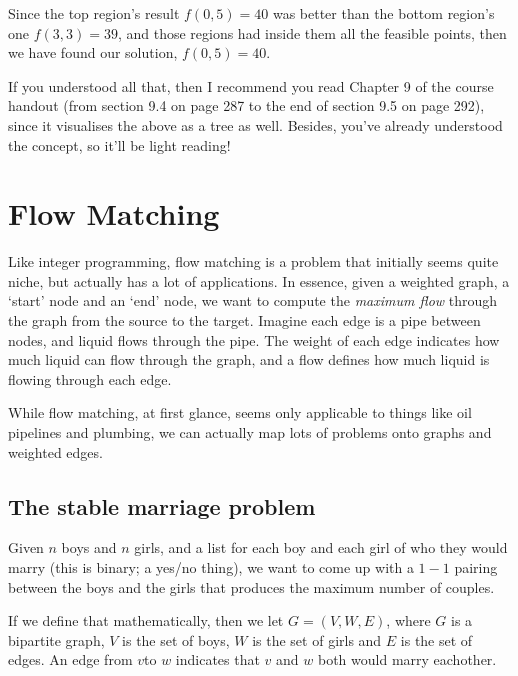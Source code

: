 \begin{enumerate}
  Since the top region's result $f(0,5) = 40$ was better than the bottom
  region's one $f(3,3) = 39$, and those regions had inside them all the
  feasible points, then we have found our solution, $f(0,5) = 40$.

  If you understood all that, then I recommend you read Chapter 9 of the course
  handout (from section 9.4 on page 287 to the end of section 9.5 on page 292),
  since it visualises the above as a tree as well. Besides, you've already
  understood the concept, so it'll be light reading!

\end{enumerate}

\section{Flow Matching}

Like integer programming, flow matching is a problem that initially seems quite
niche, but actually has a lot of applications. In essence, given a weighted
graph, a `start' node and an `end' node, we want to compute the \textit{maximum
flow} through the graph from the source to the target. Imagine each edge is a
pipe between nodes, and liquid flows through the pipe. The weight of each edge
indicates how much liquid can flow through the graph, and a flow defines how
much liquid is flowing through each edge.

While flow matching, at first glance, seems only applicable to things like oil
pipelines and plumbing, we can actually map lots of problems onto graphs and
weighted edges.

\subsection{The stable marriage problem}

Given $n$ boys and $n$ girls, and a list for each boy and each girl of who they
would marry (this is binary; a yes/no thing), we want to come up with a $1-1$
pairing between the boys and the girls that produces the maximum number of
couples.

If we define that mathematically, then we let $G = (V, W, E)$, where $G$ is a
bipartite graph, $V$ is the set of boys, $W$ is the set of girls and $E$ is the
set of edges. An edge from $v$to $w$ indicates that $v$ and $w$ both would marry
eachother.

